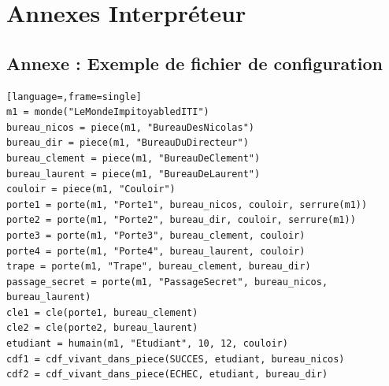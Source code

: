 \documentclass[a4paper, 12pt]{report}
\begin{document}
\chapter{Annexes Interpréteur}

\section{Annexe : Exemple de fichier de configuration}
\label{annexe:exemple-cfg}

\begin{lstlisting}[language=,frame=single]
m1 = monde("LeMondeImpitoyabledITI")
bureau_nicos = piece(m1, "BureauDesNicolas")
bureau_dir = piece(m1, "BureauDuDirecteur")
bureau_clement = piece(m1, "BureauDeClement")
bureau_laurent = piece(m1, "BureauDeLaurent")
couloir = piece(m1, "Couloir")
porte1 = porte(m1, "Porte1", bureau_nicos, couloir, serrure(m1))
porte2 = porte(m1, "Porte2", bureau_dir, couloir, serrure(m1))
porte3 = porte(m1, "Porte3", bureau_clement, couloir)
porte4 = porte(m1, "Porte4", bureau_laurent, couloir)
trape = porte(m1, "Trape", bureau_clement, bureau_dir)
passage_secret = porte(m1, "PassageSecret", bureau_nicos, bureau_laurent)
cle1 = cle(porte1, bureau_clement)
cle2 = cle(porte2, bureau_laurent)
etudiant = humain(m1, "Etudiant", 10, 12, couloir)
cdf1 = cdf_vivant_dans_piece(SUCCES, etudiant, bureau_nicos)
cdf2 = cdf_vivant_dans_piece(ECHEC, etudiant, bureau_dir)
\end{lstlisting}
\end{document}
